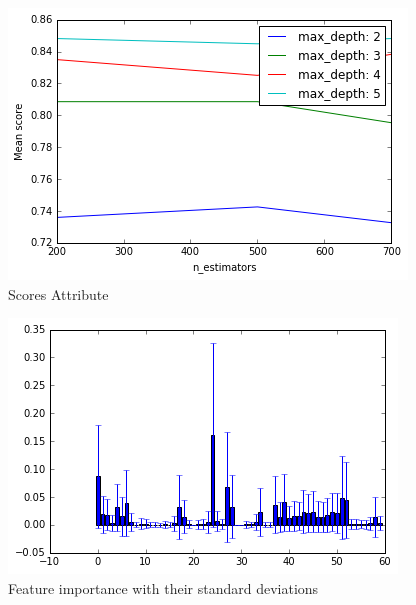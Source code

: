 \documentclass[sigconf]{acmart}
\begin{document}
\begin{figure}
    \centering
    \includegraphics[width=1.0\columnwidth]{project/images/output_15_1.png}
    \caption{Scores Attribute}
    \label{Score}
\end{figure}

\begin{figure}
    \centering
    \includegraphics[width=1.0\columnwidth]{project/images/output_17_0.png}
    \caption{Feature importance with their standard deviations}
    \label{Featites Format}
\end{figure}
\end{document}
